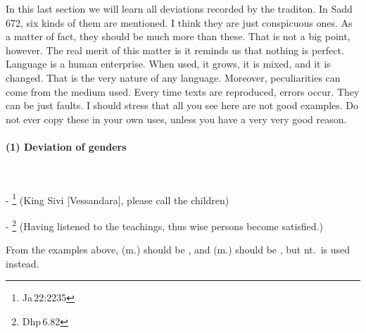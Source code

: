 In this last section we will learn all deviations recorded by the traditon. In Sadd\,672, six kinds of them are mentioned. I think they are just conspicuous ones. As a matter of fact, they should be much more than these. That is not a big point, however. The real merit of this matter is it reminds us that nothing is perfect. Language is a human enterprise. When used, it grows, it is mixed, and it is changed. That is the very nature of any language. Moreover, peculiarities can come from the medium used. Every time texts are reproduced, errors occur. They can be just faults. I should stress that all you see here are not good examples. Do not ever copy these in your own uses, unless you have a very very good reason.

\paragraph*{(1) Deviation of genders}\ \par
- \footnote{Ja\,22:2235} (King Sivi [Vessandara], please call the children)\par
- \footnote{Dhp\,6.82} (Having listened to the teachings, thus wise persons become satisfied.)\par
From the examples above,  (m.) should be , and  (m.) should be , but nt.\ is used instead.

